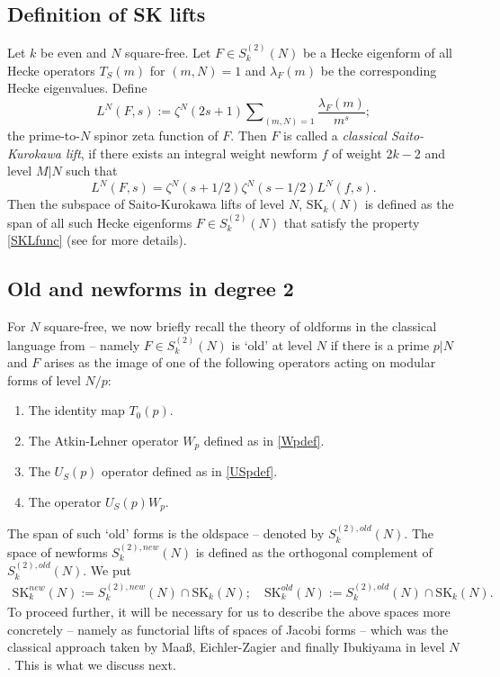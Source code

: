 \documentclass[11pt]{amsart}
\numberwithin{equation}{section}
\theoremstyle{plain}
\theoremstyle{definition}
\newcommand{\mrm}{\mathrm}
\newcommand{\q}{\quad}
\newcommand{\sumn}{\sum \nolimits}
\newcommand{\sktwon}{S_k^{(2)}(N)}
\newcommand{\sktwonnew}{S_k^{(2),new}(N)}
\newcommand{\sktwonold}{S_k^{(2),old}(N)}
\newcommand{\skk}{\mrm{SK}_k}
\newcommand{\skkn}{\mrm{SK}_k(N)}
\begin{document}
\subsection{Definition of SK lifts} \label{sklift-defn}
Let $k$ be even and $N$ square-free. Let $F\in S_k^{(2)}(N)$ be a Hecke eigenform of all Hecke operators $T_S(m)$ for $(m,N)=1$ and $\lambda_F(m)$ be the corresponding Hecke eigenvalues. Define
\begin{equation}
    L^N(F,s):= \zeta^{N}(2s+1)\sumn_{(m,N)=1}\frac{\lambda_F(m)}{m^s};
\end{equation}
the prime-to-$N$ spinor zeta function of $F$.
Then $F$ is called a \textit{classical Saito-Kurokawa lift}, if there exists an integral weight newform $f$ of weight $2k-2$ and level $M|N$ such that
\begin{equation}\label{SKLfunc}
    L^N(F,s)= \zeta^N(s+1/2)\zeta^N(s-1/2)L^N(f,s).
\end{equation}
Then the subspace of Saito-Kurokawa lifts of level $N$, $\skkn$ is defined as the span of all such Hecke eigenforms $F\in S_k^{(2)}(N)$ that satisfy the property \eqref{SKLfunc} (see \cite{dickson2015siegel, schmidt-SKlift} for more details).

\subsection{Old and newforms in degree 2} \label{skold}
For $N$ square-free, we now briefly recall the theory of oldforms in the classical language from \cite{schmidt-AL} -- namely $F \in \sktwon$ is `old' at level $N$ if there is a prime $p|N$ and $F$ arises as the image of one of the following operators acting on modular forms of level $N/p$:
\begin{enumerate} \label{Schmidt-old}
    \item The identity map $T_0(p)$.
    \item The Atkin-Lehner operator $W_p$ defined as in \eqref{Wpdef}.
    \item The $U_S(p)$ operator defined as in \eqref{USpdef}.
    \item The operator $U_S(p)W_p$.
\end{enumerate}
The span of such `old' forms is the oldspace -- denoted by $\sktwonold$. The space of newforms $ \sktwonnew$ is defined as the orthogonal complement of $\sktwonold$. We put 
\begin{align} \label{new-old-def}
    \skk^{new}(N) := \sktwonnew \cap \skkn; \q \skk^{old}(N) := \sktwonold \cap \skkn.
\end{align}
To proceed further, it will be necessary for us to describe the above spaces more concretely -- namely as functorial lifts of spaces of Jacobi forms -- which was the classical approach taken by Maa{\ss}, Eichler-Zagier \cite{EZ} and finally Ibukiyama \cite{Ibu-SK} in level $N$. This is what we discuss next.
\end{document}
